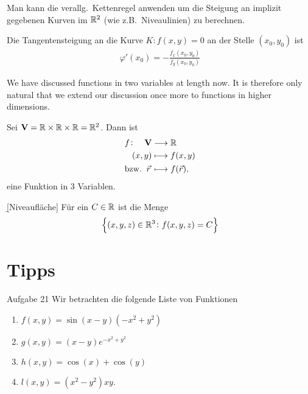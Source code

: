 \documentclass[12pt]{article}
\begin{document}
\begin{fct}
    Man kann die verallg.\ Kettenregel anwenden um die Steigung an implizit gegebenen Kurven im $\mathbb{R}^2$ (wie z.B.\ Niveaulinien) zu berechnen.
\end{fct}

\begin{thmb}{}
    Die Tangentensteigung an die Kurve $K: f(x,y)=0$ an der Stelle $(x_0,y_0)$ ist
    \begin{align}
        \varphi'(x_0)=-\frac{f_x(x_0,y_0)}{f_y(x_0,y_0)}
    \end{align}
\end{thmb}

We have discussed functions in two variables at length now. It is therefore
only natural that we extend our discussion once more to functions in higher
dimensions.

\begin{thmb}{}
    Sei $\mathbf{V}=\mathbb{R}\times\mathbb{R}\times\mathbb{R}=\mathbb{R}^2$. Dann ist
    \begin{align}
        &\begin{aligned}
            f\colon\quad \mathbf{V} & \longrightarrow\mathbb{R}   \\
            (x,y)              & \longmapsto f(x,y)
        \end{aligned}\\
        &\text{bzw.}\ \:\vec{r}\,\longmapsto f(\vec{r}),
    \end{align}
    eine Funktion in 3 Variablen.
\end{thmb}\vspace*{1em}

\begin{defn}{\b{[Niveaufläche]}}
    Für ein $C\in\mathbb{R}$ ist die Menge
    \begin{align}
        \left\{(x,y,z)\in\mathbb{R}^3\colon f(x,y,z)=C\right\}
    \end{align}
\end{defn}



\section{Tipps}
\setcounter{nexc}{1}

\begin{nexercise}{Aufgabe 2}{1}
    Wir betrachten die folgende Liste von Funktionen

    \begin{varwidth}{\textwidth}
        \begin{enumerate}[label=(\alph*)]
            \item $f(x,y)=\sin(x-y)(-x^2+y^2)$
            \item $g(x,y)=(x-y)e^{-x^2+y^2}$
            \item $h(x,y)=\cos(x)+\cos(y)$
            \item $l(x,y)=(x^2-y^2)xy.$
        \end{enumerate}
    \end{varwidth}
\end{nexercise}
\end{document}
